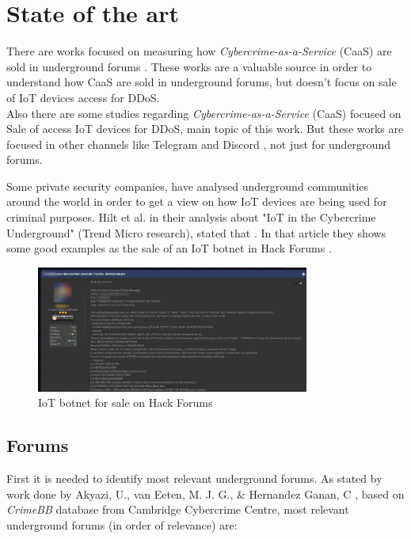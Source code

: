 \section{State of the art}

There are works focused on measuring how \textit{Cybercrime-as-a-Service} (CaaS) are sold in underground forums \cite{measuringCaaS}. These works are a valuable source in order to understand how CaaS are sold in underground forums, but doesn't focus on sale of IoT devices access for DDoS. \\
Also there are some studies regarding \textit{Cybercrime-as-a-Service} (CaaS) focused on Sale of access IoT devices for DDoS, main topic of this work. But these works are focused in other channels like Telegram and Discord \cite{booters}, not just for underground forums.

Some private security companies, have analysed underground communities around the world in order to get a view on how IoT devices are being used for criminal purposes. Hilt et al. in their analysis about "IoT in the Cybercrime Underground" \cite{trendMicroConclusions} (Trend Micro research), stated that . In that article they shows some good examples as the sale of an IoT botnet in Hack Forums \cite{trendMicroHackForums}.

\begin{figure}
	\centering
	\includegraphics[width=0.8\textwidth]{figs/hf_sale_iot.png}
	\caption{IoT botnet for sale on Hack Forums}
	\label{fig:hf_sale_iot}
\end{figure}

\subsection{Forums}
\label{sec:forums}

First it is needed to identify most relevant underground forums. As stated by work done by Akyazi, U., van Eeten, M. J. G., \& Hernandez Ganan, C \cite{measuringCaaS}, based on \textit{CrimeBB} \cite{crimeBB} database from Cambridge Cybercrime Centre, most relevant underground forums (in order of relevance) are:

